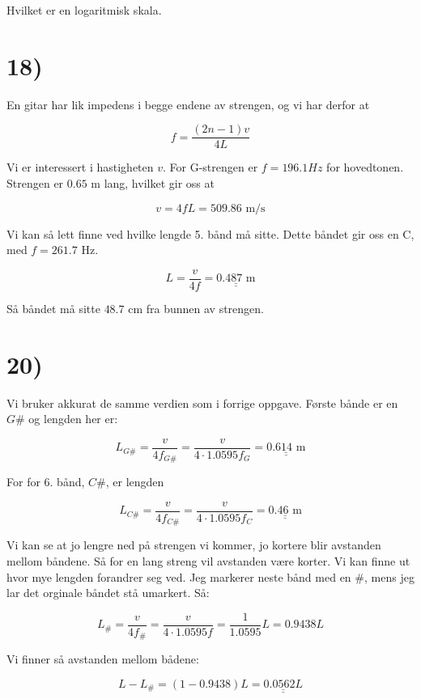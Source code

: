 \documentclass[a4paper,norsk, 10pt]{article}
\begin{document}
Hvilket er en logaritmisk skala.

\section*{18)}
En gitar har lik impedens i begge endene av strengen, og vi har derfor at

$$
f = \frac{(2n-1)v}{4L}
$$

Vi er interessert i hastigheten $v$. For G-strengen er $f=196.1 Hz$ for hovedtonen. Strengen er $0.65$ m lang, hvilket gir oss at

$$
v = 4fL = 509.86 \text{ m/s}
$$

Vi kan så lett finne ved hvilke lengde 5. bånd må sitte. Dette båndet gir oss en C, med $f = 261.7$ Hz.

$$
L = \frac{v}{4f} = \underline{\underline{0.487 \text{ m}}}
$$

Så båndet må sitte $48.7$ cm fra bunnen av strengen.

\section*{20)}
Vi bruker akkurat de samme verdien som i forrige oppgave. Første bånde er en $G\#$ og lengden her er:

$$
L_{G\#} = \frac{v}{4f_{G\#}} = \frac{v}{4\cdot 1.0595f_{G}} = \underline{\underline{0.614 \text{ m}}}
$$

For for 6. bånd, $C\#$, er lengden

$$
L_{C\#} = \frac{v}{4f_{C\#}} = \frac{v}{4\cdot 1.0595f_{C}} = \underline{\underline{0.46 \text{ m}}}
$$

Vi kan se at jo lengre ned på strengen vi kommer, jo kortere blir avstanden mellom båndene. Så for en lang streng vil avstanden være korter. Vi kan finne ut hvor mye lengden forandrer seg ved. Jeg markerer neste bånd med en $\#$, mens jeg lar det orginale båndet stå umarkert. Så:

$$
L_{\#} =\frac{v}{4f_{\#}} = \frac{v}{4\cdot 1.0595f} = \frac{1}{1.0595}L = 0.9438 L
$$

Vi finner så avstanden mellom bådene:

$$
L - L_{\#} = (1-0.9438)L = \underline{\underline{0.0562 L}}
$$
\end{document}
